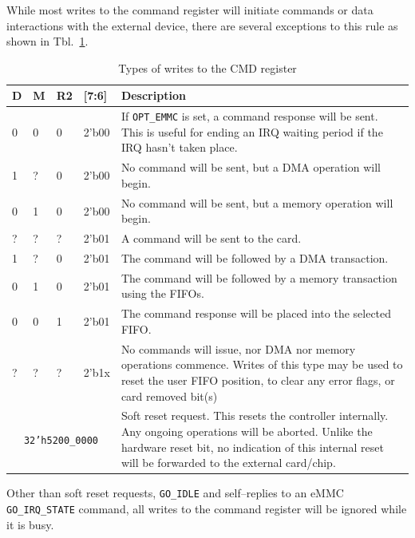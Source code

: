 \documentclass{gqtekspec}
\begin{document}
While most writes to the command register will initiate commands or data
interactions with the external device, there are several exceptions to this
rule as shown in Tbl.~\ref{tbl:CMD-BITS}.
\begin{table}\begin{center}
\begin{tabular}{|p{0.36in}|p{0.36in}|p{0.36in}|p{0.36in}|p{4.0in}|}\hline
	\rowcolor[gray]{0.85} D & M & R2 & [7:6] & Description\\\hline\hline
0 & 0 & 0 & 2'b00 & If {\tt OPT\_EMMC} is set, a command response will be
	sent.  This is useful for ending an IRQ waiting period if the IRQ
	hasn't taken place. \\
1 & ? & 0 & 2'b00 & No command will be sent, but a DMA operation will
	begin. \\
0 & 1 & 0 & 2'b00 & No command will be sent, but a memory operation will
	begin. \\
? & ? & ? & 2'b01 & A command will be sent to the card. \\
1 & ? & 0 & 2'b01 & The command will be followed by a DMA transaction. \\
0 & 1 & 0 & 2'b01 & The command will be followed by a memory transaction
	using the FIFOs. \\
0 & 0 & 1 & 2'b01 & The command response will be placed into the selected
	FIFO. \\
? & ? & ? & 2'b1x & No commands will issue, nor DMA nor memory operations
	commence.  Writes of this type may be used to reset the user FIFO
	position, to clear any error flags, or card removed bit(s)\\\cline{1-4}
\multicolumn{4}{|c|}{{\tt 32'h5200\_0000}} & Soft reset request.  This
	resets the controller internally.  Any ongoing operations will be
	aborted.  Unlike the hardware reset bit, no indication of this internal
	reset will be forwarded to the external card/chip.  \\\hline
\end{tabular}
\caption{Types of writes to the CMD register}\label{tbl:CMD-BITS}
\end{center}\end{table}
Other than soft reset requests, {\tt GO\_IDLE} and self--replies to an eMMC
{\tt GO\_IRQ\_STATE} command, all writes to the command register will be
ignored while it is busy.
\end{document}
